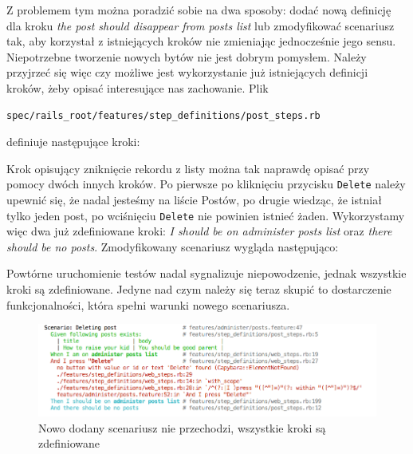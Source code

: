     Z problemem tym można poradzić sobie na dwa sposoby: dodać nową definicję dla kroku \emph{the post should disappear from posts list} lub zmodyfikować scenariusz tak, aby korzystał z istniejących kroków nie zmieniając jednocześnie jego sensu. Niepotrzebne tworzenie nowych bytów nie jest dobrym pomysłem. Należy przyjrzeć się więc czy możliwe jest wykorzystanie już istniejących definicji kroków, żeby opisać interesujące nas zachowanie. Plik
    
\begin{lstlisting}
spec/rails_root/features/step_definitions/post_steps.rb
\end{lstlisting}
    
    definiuje następujące kroki:
    
    
    
    Krok opisujący zniknięcie rekordu z listy można tak naprawdę opisać przy pomocy dwóch innych kroków. Po pierwsze po kliknięciu przycisku \texttt{Delete} należy upewnić się, że nadal jesteśmy na liście Postów, po drugie wiedząc, że istniał tylko jeden post, po wciśnięciu \texttt{Delete} nie powinien istnieć żaden. Wykorzystamy więc dwa już zdefiniowane kroki: \emph{I should be on administer posts list} oraz \emph{there should be no posts}. Zmodyfikowany scenariusz wygląda następująco:
    
    
    
    Powtórne uruchomienie testów nadal sygnalizuje niepowodzenie, jednak wszystkie kroki są zdefiniowane. Jedyne nad czym należy się teraz skupić to dostarczenie funkcjonalności, która spełni warunki nowego scenariusza.
     
     \clearpage
     
     \begin{figure}[!h]
   		\begin{center}
   			\includegraphics[width=\linewidth]{images/scenario_failure_2.png}
   			\caption{Nowo dodany scenariusz nie przechodzi, wszystkie kroki są zdefiniowane}
   			\label{scenario_failure_2}
   		\end{center}
   	\end{figure}
   	
